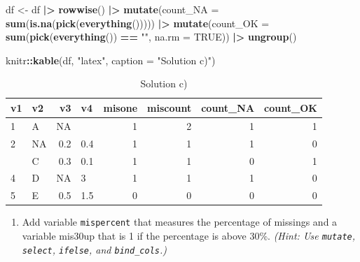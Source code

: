 \documentclass[
  doc]{apa6}
\newenvironment{Shaded}{\begin{snugshade}}{\end{snugshade}}
\newcommand{\AttributeTok}[1]{\textcolor[rgb]{0.13,0.29,0.53}{#1}}
\newcommand{\ConstantTok}[1]{\textcolor[rgb]{0.56,0.35,0.01}{#1}}
\newcommand{\FunctionTok}[1]{\textcolor[rgb]{0.13,0.29,0.53}{\textbf{#1}}}
\newcommand{\NormalTok}[1]{#1}
\newcommand{\OtherTok}[1]{\textcolor[rgb]{0.56,0.35,0.01}{#1}}
\newcommand{\SpecialCharTok}[1]{\textcolor[rgb]{0.81,0.36,0.00}{\textbf{#1}}}
\newcommand{\StringTok}[1]{\textcolor[rgb]{0.31,0.60,0.02}{#1}}
\providecommand{\tightlist}{%
  \setlength{\itemsep}{0pt}\setlength{\parskip}{0pt}}
\begin{document}
\newpage

\begin{Shaded}
\begin{Highlighting}[]
\NormalTok{df }\OtherTok{\textless{}{-}}\NormalTok{ df }\SpecialCharTok{|\textgreater{}} 
  \FunctionTok{rowwise}\NormalTok{() }\SpecialCharTok{|\textgreater{}} 
  \FunctionTok{mutate}\NormalTok{(}\AttributeTok{count\_NA =} \FunctionTok{sum}\NormalTok{(}\FunctionTok{is.na}\NormalTok{(}\FunctionTok{pick}\NormalTok{(}\FunctionTok{everything}\NormalTok{())))) }\SpecialCharTok{|\textgreater{}} 
  \FunctionTok{mutate}\NormalTok{(}\AttributeTok{count\_OK =} \FunctionTok{sum}\NormalTok{(}\FunctionTok{pick}\NormalTok{(}\FunctionTok{everything}\NormalTok{()) }\SpecialCharTok{==} \StringTok{""}\NormalTok{, }\AttributeTok{na.rm =} \ConstantTok{TRUE}\NormalTok{)) }\SpecialCharTok{|\textgreater{}} 
  \FunctionTok{ungroup}\NormalTok{()}

\NormalTok{knitr}\SpecialCharTok{::}\FunctionTok{kable}\NormalTok{(df, }\StringTok{"latex"}\NormalTok{, }\AttributeTok{caption =} \StringTok{"Solution c)"}\NormalTok{)}
\end{Highlighting}
\end{Shaded}

\begin{table}

\caption{\label{tab:unnamed-chunk-4}Solution c)}
\centering
\begin{tabular}[t]{l|l|r|l|r|r|r|r}
\hline
v1 & v2 & v3 & v4 & misone & miscount & count\_NA & count\_OK\\
\hline
1 & A & NA &  & 1 & 2 & 1 & 1\\
\hline
2 & NA & 0.2 & 0.4 & 1 & 1 & 1 & 0\\
\hline
 & C & 0.3 & 0.1 & 1 & 1 & 0 & 1\\
\hline
4 & D & NA & 3 & 1 & 1 & 1 & 0\\
\hline
5 & E & 0.5 & 1.5 & 0 & 0 & 0 & 0\\
\hline
\end{tabular}
\end{table}

\newpage

\begin{enumerate}
\def\labelenumi{\alph{enumi})}
\setcounter{enumi}{3}
\tightlist
\item
  Add variable \texttt{mispercent} that measures the percentage of missings and a variable mis30up that is 1 if the percentage is above 30\%. \emph{(Hint: Use \texttt{mutate}, \texttt{select}, \texttt{ifelse}, and \texttt{bind\_cols}.)}
\end{enumerate}
\end{document}
